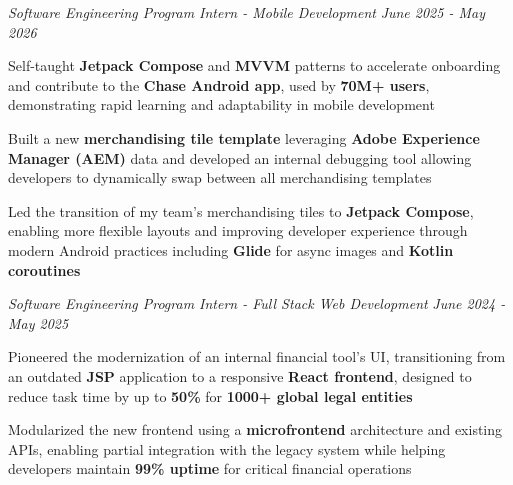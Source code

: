 \documentclass[letterpaper]{article}
\begin{document}
    \textit{Software Engineering Program Intern - Mobile Development} \hfill \textsl{June 2025 - May 2026}\\
    \vspace{-7pt}
    \begin{tightitemize} \itemsep -1mm

            \item Self-taught \textbf{Jetpack Compose} and \textbf{MVVM} patterns to accelerate onboarding and contribute to the \textbf{Chase Android app}, used by \textbf{70M+ users}, demonstrating rapid learning and adaptability in mobile development
            
            \item Built a new \textbf{merchandising tile template} leveraging \textbf{Adobe Experience Manager (AEM)} data and developed an internal debugging tool allowing developers to dynamically swap between all merchandising templates
            
            \item Led the transition of my team's merchandising tiles to \textbf{Jetpack Compose}, enabling more flexible layouts and improving developer experience through modern Android practices including \textbf{Glide} for async images and \textbf{Kotlin coroutines}
                 
    \end{tightitemize}
    \textit{Software Engineering Program Intern - Full Stack Web Development} \hfill \textsl{June 2024 - May 2025}\\
    \vspace{-7pt}
    \begin{tightitemize} \itemsep -1mm

            \item Pioneered the modernization of an internal financial tool's UI, transitioning from an outdated \textbf{JSP} application to a responsive \textbf{React frontend}, designed to reduce task time by up to \textbf{50\%} for \textbf{1000+ global legal entities}

            \item Modularized the new frontend using a \textbf{microfrontend} architecture and existing APIs, enabling partial integration with the legacy system while helping developers maintain \textbf{99\% uptime} for critical financial operations
                    
    \end{tightitemize}
    \vspace{-2mm}
\end{document}
